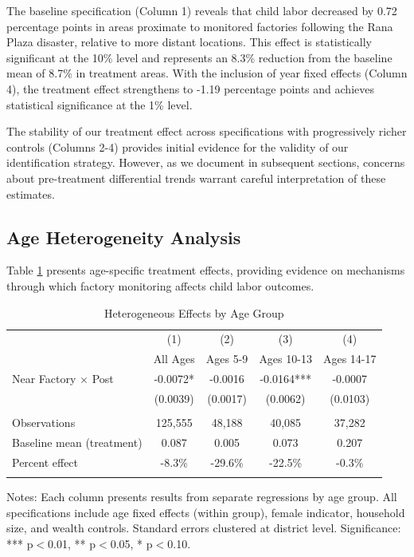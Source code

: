 The baseline specification (Column 1) reveals that child labor decreased by 0.72 percentage points in areas proximate to monitored factories following the Rana Plaza disaster, relative to more distant locations. This effect is statistically significant at the 10\% level and represents an 8.3\% reduction from the baseline mean of 8.7\% in treatment areas. With the inclusion of year fixed effects (Column 4), the treatment effect strengthens to -1.19 percentage points and achieves statistical significance at the 1\% level.

The stability of our treatment effect across specifications with progressively richer controls (Columns 2-4) provides initial evidence for the validity of our identification strategy. However, as we document in subsequent sections, concerns about pre-treatment differential trends warrant careful interpretation of these estimates.

\subsection{Age Heterogeneity Analysis}

Table \ref{tab:age_hetero_updated} presents age-specific treatment effects, providing evidence on mechanisms through which factory monitoring affects child labor outcomes.

\begin{table}[H]
\centering
\caption{Heterogeneous Effects by Age Group}
\label{tab:age_hetero_updated}
\begin{threeparttable}
\begin{tabular}{lcccc}
\toprule
& (1) & (2) & (3) & (4) \\
& All Ages & Ages 5-9 & Ages 10-13 & Ages 14-17 \\
\midrule
Near Factory $\times$ Post & -0.0072* & -0.0016 & -0.0164*** & -0.0007 \\
& (0.0039) & (0.0017) & (0.0062) & (0.0103) \\
\\
\midrule
Observations & 125,555 & 48,188 & 40,085 & 37,282 \\
Baseline mean (treatment) & 0.087 & 0.005 & 0.073 & 0.207 \\
Percent effect & -8.3\% & -29.6\% & -22.5\% & -0.3\% \\
\\
\bottomrule
\end{tabular}
\begin{tablenotes}
\footnotesize
\item Notes: Each column presents results from separate regressions by age group. All specifications include age fixed effects (within group), female indicator, household size, and wealth controls. Standard errors clustered at district level. Significance: *** p$<$0.01, ** p$<$0.05, * p$<$0.10.
\end{tablenotes}
\end{threeparttable}
\end{table}


